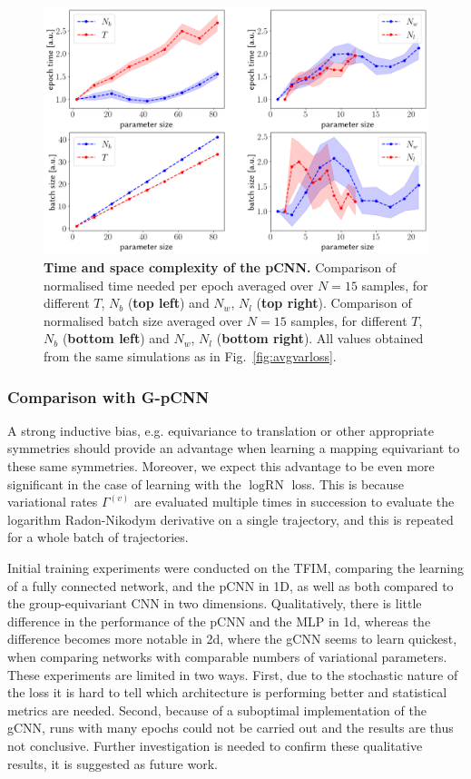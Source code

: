 \begin{figure}[H]
	\centering
	\includegraphics[width=\linewidth]{Chapter5/Figs/Raster/initial_time_space}
	\caption[Time and space complexity of the pCNN]{\textbf{Time and space complexity of the pCNN.} Comparison of normalised time needed per epoch averaged over $N=15$ samples, for different $T$, $N_b$ (\textbf{top left}) and $N_w$, $N_l$ (\textbf{top right}). Comparison of normalised batch size averaged over $N=15$ samples, for different $T$, $N_b$ (\textbf{bottom left}) and $N_w$, $N_l$ (\textbf{bottom right}). All values obtained from the same simulations as in Fig.~\ref{fig:avgvarloss}.}
	\label{fig:initialtimespace}
\end{figure}

\subsubsection{Comparison with G-pCNN}
A strong inductive bias, e.g. equivariance to translation or other appropriate symmetries should provide an advantage when learning a mapping equivariant to these same symmetries. Moreover, we expect this advantage to be even more significant in the case of learning with the $\log \text{RN}$ loss. This is because variational rates $\Gamma^{(v)}$ are evaluated multiple times in succession to evaluate the logarithm Radon-Nikodym derivative on a single trajectory, and this is repeated for a whole batch of trajectories.  

Initial training experiments were conducted on the TFIM, comparing the learning of a fully connected network, and the pCNN in 1D, as well as both compared to the group-equivariant CNN in two dimensions. Qualitatively, there is little difference in the performance of the pCNN and the MLP in 1d, whereas the difference becomes more notable in 2d, where the gCNN seems to learn quickest, when comparing networks with comparable numbers of variational parameters. These experiments are limited in two ways. First, due to the stochastic nature of the loss it is hard to tell which architecture is performing better and statistical metrics are needed. Second, because of a suboptimal implementation of the gCNN, runs with many epochs could not be carried out and the results are thus not conclusive. Further investigation is needed to confirm these qualitative results, it is suggested as future work. 

